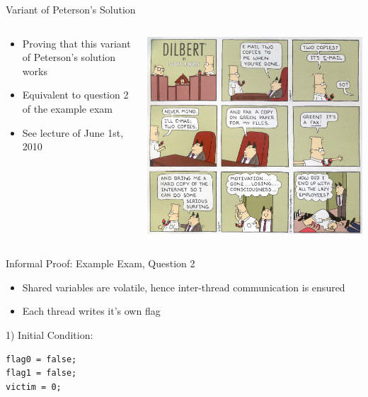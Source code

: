 \begin{frame}{Variant of Peterson's Solution}
  \begin{columns}[c]
    \begin{column}{0.35\textwidth}
      \begin{itemize}
      \item Proving that this variant of Peterson's solution works
      \item Equivalent to question 2 of the example exam
      \item See lecture of June 1st, 2010
      \end{itemize}
    \end{column}
    \begin{column}{0.65\textwidth}
      \begin{center}
        \includegraphics[width=\textwidth]{figures/dilbert}
      \end{center}
    \end{column}
  \end{columns}
\end{frame}

\begin{frame}[fragile]{Informal Proof: Example Exam, Question 2}
  \begin{itemize}
  \item Shared variables are volatile, hence inter-thread
    communication is ensured
  \item Each thread writes it's own flag
  \end{itemize}


  1) Initial Condition:

  \begin{lstlisting}
flag0 = false;
flag1 = false;
victim = 0;    
  \end{lstlisting}
\end{frame}

